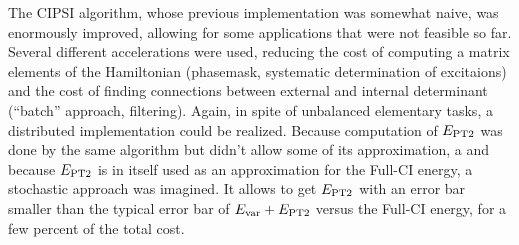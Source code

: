 \documentclass[12pt,a4paper]{report}
\begin{document}
The CIPSI algorithm, whose previous implementation was somewhat naive, was enormously improved, allowing for some applications that were not feasible so far. Several different accelerations were used, reducing the cost of computing a matrix elements of the Hamiltonian (phasemask, systematic determination of excitaions) and the cost of finding connections between external and internal determinant (``batch'' approach, filtering). Again, in spite of unbalanced elementary tasks, a distributed implementation could be realized.
Because computation of $E_\text{PT2}$ was done by the same algorithm but didn't allow some of its approximation, a and because $E_\text{PT2}$ is in itself used as an approximation for the Full-CI energy, a stochastic approach was imagined. It allows to get $E_\text{PT2}$ with an error bar smaller than the typical error bar of $E_{\text{var}} + E_\text{PT2}$ versus the Full-CI energy, for a few percent of the total cost.








%
\end{document}
